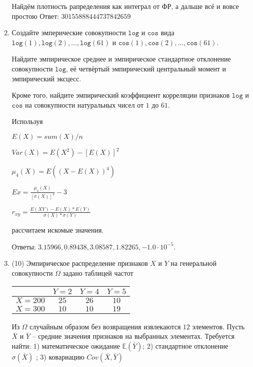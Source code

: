 \documentclass[a4paper,12pt]{article}
\begin{document}
\begin{enumerate}
Найдём плотность рапределения как интеграл от ФР, а дальше всё и вовсе простою Ответ: $30155888444737842659$


\item

    
    Создайте эмперические совокупности  $\mathtt{\text{log}}$ и $\mathtt{\text{cos}}$ вида $\mathtt{\text{log}}(1),\mathtt{\text{log}}(2), ..., \mathtt{\text{log}}(61) $ и $\mathtt{\text{cos}}(1),\mathtt{\text{cos}}(2), ..., \mathtt{\text{cos}}(61). $

    Найдите эмпирическое среднее и эмпирическое стандартное отклонение совокупности $\mathtt{\text{log}}$, её четвёртый эмпирический центральный момент и эмпирический эксцесс.

    Кроме того, найдите эмпирический коэффициент корреляции признаков $\mathtt{\text{log}}$ и $\mathtt{\text{cos}}$ на совокупности натуральных чисел от $1$ до $61$.
    


    
    Используя

	$E(X) = sum(X) / n$

	$Var(X) = E(X^2) - [E(X)]^2$

	$\mu_4(X) = E((X-E(X))^4)$

	$Ex = \frac{\mu_4(X)}{[\sigma(X)]^4} - 3$

	$r_{xy} = \frac{E(XY) - E(X) * E(Y)}{\sigma(X) * \sigma(Y)}$

    рассчитаем искомые значения.

    Ответы: $3.15966, 0.89438, 3.08587, 1.82265, -1.0 \cdot 10^{-5}$.

    

\item


(10) Эмпирическое распределение признаков $X$ и $Y$ на генеральной совокупности $\Omega$ задано таблицей частот  
 
\begin{tabular}{ | c | c | c | c | }
\hline
 & $Y = 2$ & $Y = 4$ & $Y = 5$  \\ \hline
$X = 200$ & $25$ & $26$ & $10$\\ \hline
$X = 300$ & $10$ & $10$ & $19$\\
\hline
\end{tabular}

Из $\Omega$ случайным образом без возвращения извлекаются $12$ элементов. 
Пусть $\bar X$ и $\bar Y$ – средние значения признаков на выбранных элементах. 
Требуется найти: 1) математическое ожидание $\mathbb{E}(\bar Y)$; 2) стандартное отклонение $\sigma(\bar X)$ ; 
3) ковариацию $Cov(\bar X, \bar Y)$





\end{enumerate}
\end{document}
